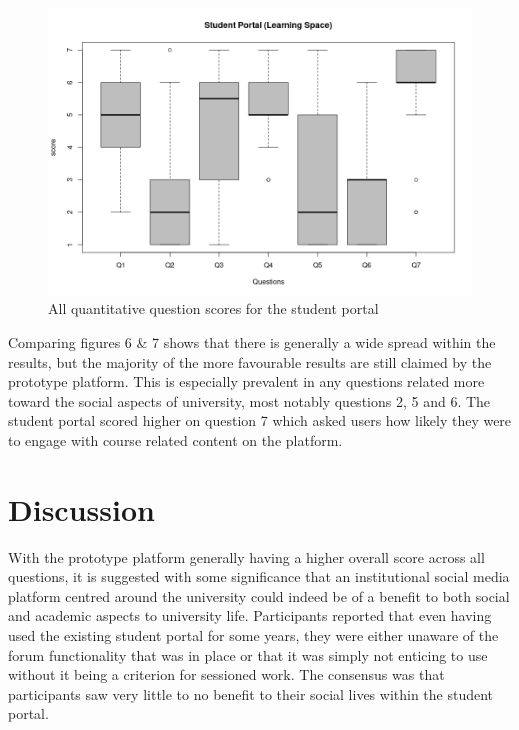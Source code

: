 \documentclass[lettersize,journal]{IEEEtran}
\begin{document}
		\begin{figure}[h!]
        		\includegraphics[width=\linewidth]{images/StudentPortalFull.png}
        		\caption{All quantitative question scores for the student portal}
        		\label{figure 6}
		\end{figure}

		Comparing figures 6 \& 7 shows that there is generally a wide spread within the results, but the majority of the more favourable results are still claimed by the prototype platform.
		This is especially prevalent in any questions related more toward the social aspects of university, most notably questions 2, 5 and 6. The student portal scored higher on question 7
		which asked users how likely they were to engage with course related content on the platform.


\section{Discussion}

With the prototype platform generally having a higher overall score across all questions, it is suggested with some significance that an institutional social media platform centred around the university
could indeed be of a benefit to both social and academic aspects to university life. Participants reported that even having used the existing student portal for some years, they were either unaware of the
forum functionality that was in place or that it was simply not enticing to use without it being a criterion for sessioned work. The consensus was that participants saw very little to no benefit
to their social lives within the student portal.
\end{document}

